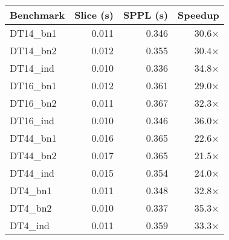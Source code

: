 \begin{tabular}{lrrr}
\toprule
Benchmark & Slice (s) & SPPL (s) & Speedup \\
\midrule
DT14_bn1 & 0.011 & 0.346 & 30.6× \\
DT14_bn2 & 0.012 & 0.355 & 30.4× \\
DT14_ind & 0.010 & 0.336 & 34.8× \\
DT16_bn1 & 0.012 & 0.361 & 29.0× \\
DT16_bn2 & 0.011 & 0.367 & 32.3× \\
DT16_ind & 0.010 & 0.346 & 36.0× \\
DT44_bn1 & 0.016 & 0.365 & 22.6× \\
DT44_bn2 & 0.017 & 0.365 & 21.5× \\
DT44_ind & 0.015 & 0.354 & 24.0× \\
DT4_bn1 & 0.011 & 0.348 & 32.8× \\
DT4_bn2 & 0.010 & 0.337 & 35.3× \\
DT4_ind & 0.011 & 0.359 & 33.3× \\
\bottomrule
\end{tabular}
